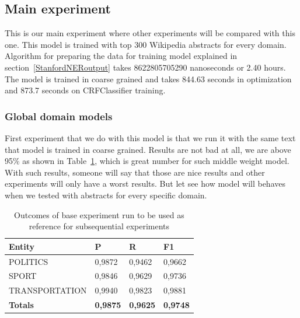\documentclass[thesis=M,english]{FITthesis}[2018/05/30]
\begin{document}
%	
\subsection{Main experiment}\label{MainExperiment}
	This is our main experiment where other experiments will be compared with this one. This model is trained with top 300 Wikipedia abstracts for every domain. Algorithm for preparing the data for training model explained in section~\ref{StanfordNERoutput}  takes 8622805705290 nanoseconds or 2.40 hours. The model is trained in coarse grained and takes 844.63 seconds in optimization and 873.7 seconds on CRFClassifier training.

\subsubsection{Global domain models}
	First experiment that we do with this model is that we run it with the same text that model is trained in coarse grained. Results are not bad at all, we are above 95\% as shown in Table~\ref{table:All3domainsWithAll3DomiansTop300Coarse}, which is great number for such middle weight model. With such results, someone will say that those are nice results and other experiments will only have a worst results. But let see how model will behaves when we tested with abstracts for every specific domain.

	\begin{table}[H]\centering
		\begin{tabular}{|l|l|l|l|}
			\hline {\textbf{Entity}} & {\textbf{P}} & {\textbf{R}} & {\textbf{F1}}\\\hline
				POLITICS & 0,9872 & 0,9462 & 0,9662\\
				SPORT & 0,9846 & 0,9629 & 0,9736\\
				TRANSPORTATION & 0,9940 & 0,9823 & 0,9881\\\hline
				\textbf{Totals} & \textbf{0,9875} & \textbf{0,9625} & \textbf{0,9748}\\\hline
		\end{tabular}
		\caption{Outcomes of base experiment run to be used as reference for subsequential experiments \label{table:All3domainsWithAll3DomiansTop300Coarse}}
	\end{table}	
	
\end{document}
